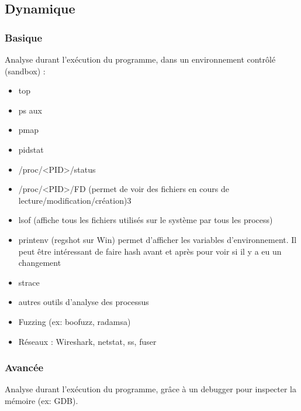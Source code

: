 \documentclass[a4paper]{article}
\begin{document}
\subsection{Dynamique}
\subsubsection{Basique}
Analyse durant l'exécution du programme, dans un environnement contrôlé (sandbox) :
\begin{itemize}[label = \textbullet, font = \Large]
    \item top
    \item ps aux
    \item pmap
    \item pidstat
    \item /proc/<PID>/status
    \item /proc/<PID>/FD (permet de voir des fichiers en cours de lecture/modification/création)3
    \item lsof (affiche tous les fichiers utilisés sur le système par tous les process)
    \item printenv (regshot sur Win) permet d'afficher les variables d'environnement. Il peut être intéressant de faire hash avant et après pour voir si il y a eu un changement
    \item strace
    \item autres outils d'analyse des processus
    \item Fuzzing (ex: boofuzz, radamsa)
    \item Réseaux : Wireshark, netstat, ss, fuser
\end{itemize}
\subsubsection{Avancée}
Analyse durant l'exécution du programme, grâce à un debugger pour inspecter la mémoire  (ex: GDB).
\end{document}
